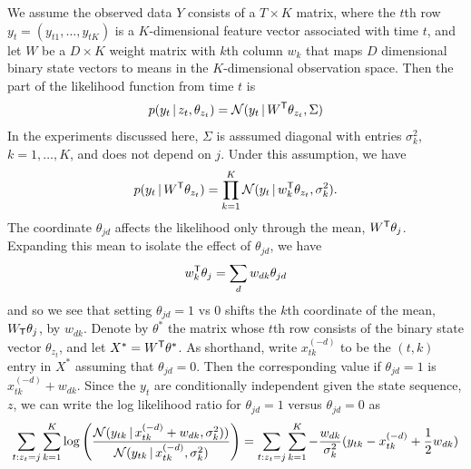 We assume the observed data $Y$ consists of a $T \times K$
matrix, where the $t$th row $y_t = (y_{t1}, \dots,
y_{tK})$ is a $K$-dimensional feature vector associated
with time $t$, and let $W$ be a $D \times K$ weight matrix
with $k$th column $w_k$ that maps $D$ dimensional binary state vectors 
to means in the $K$-dimensional observation space.  Then
the part of the likelihood function from time $t$ is
\begin{equation}
  \label{eq:74}
  p(y_t \, \vert \, z_t, \theta_{z_t}) = \mathcal{N}(y_t \, \vert \, W^{\sf T}\theta_{z_t},\Sigma)
\end{equation}
In the experiments discussed here, $\Sigma$ is asssumed diagonal with entries $\sigma^2_k$, $k = 1, \dots, K$, and does not depend on $j$.  Under this assumption, we have
\begin{equation}
  \label{eq:73}
  p(y_t \, \vert \, W^{\mathsf{T}} \theta_{z_t}) = \prod_{k=1}^K \mathcal{N}(y_t \, \vert \, w_k^{\sf T}\theta_{z_t},\sigma^2_k).
\end{equation}
The coordinate $\theta_{jd}$ affects the likelihood only through the mean, $W^{\sf T} \theta_j$.  Expanding this mean to isolate the effect of $\theta_{jd}$, we have
\begin{equation*}
  w_k^{\sf T}\theta_j = \sum_{d} w_{dk} \theta_{jd}
\end{equation*}
and so we see that setting $\theta_{jd} = 1$ vs 0 shifts the $k$th coordinate 
of the mean, $W_{\sf T} \theta_{j}$, by $w_{dk}$.  Denote by $\theta^*$ the matrix 
whose $t$th row consists of the binary state vector $\theta_{z_t}$, and 
let $X^* = W^{\sf T} \theta^*$.  As shorthand, write $x_{tk}^{(-d)}$ to be the $(t,k)$ entry in $X^*$ assuming that $\theta_{jd} = 0$. Then the corresponding value if $\theta_{jd} = 1$ is $x_{tk}^{(-d)} + w_{dk}$. Since the $y_t$ are conditionally independent given the state sequence, $z$, we can write the log likelihood ratio for $\theta_{jd} = 1$ versus $\theta_{jd} = 0$ as
\begin{equation}
  \label{eq:91}
  \sum_{t: z_t = j} \sum_{k=1}^K\log\left(\frac{\mathcal{N}(y_{tk} \, \vert \,
    x_{tk}^{(-d)} + w_{dk},\sigma^2_k))}{\mathcal{N}(y_{tk} \, \vert \,
    x_{tk}^{(-d)},\sigma^2_k)}\right) = \sum_{t: z_t = j} \sum_{k=1}^K -\frac{w_{dk}}{\sigma^2_k}(y_{tk} - x_{tk}^{(-d)} + \frac{1}{2}w_{dk})
\end{equation}

